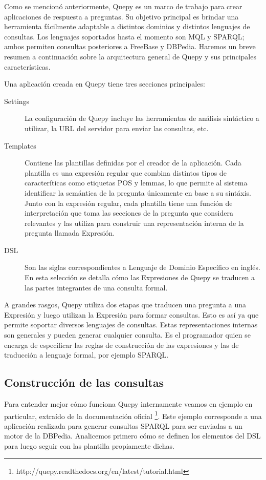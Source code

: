Como se mencionó anteriormente, Quepy es un marco de trabajo para crear aplicaciones de respuesta a preguntas. Su objetivo principal es brindar una herramienta fácilmente adaptable a distintos dominios y distintos lenguajes de consultas. Los lenguajes soportados hasta el momento son MQL y SPARQL; ambos permiten consultas posteriores a FreeBase y DBPedia. Haremos un breve resumen a continuación sobre la arquitectura general de Quepy y sus principales características.

Una aplicación creada en Quepy tiene tres secciones principales:
\begin{description}
    \item[Settings] La configuración de Quepy incluye las herramientas de análisis sintáctico a utilizar, la URL del servidor para enviar las consultas, etc.
    \item[Templates] Contiene las plantillas definidas por el creador de la aplicación. Cada plantilla es una expresión regular que combina distintos tipos de caracteríticas como etiquetas POS y lemmas, lo que permite al sistema identificar la semántica de la pregunta únicamente en base a su sintáxis. Junto con la expresión regular, cada plantilla tiene una función de interpretación que toma las secciones de la pregunta que considera relevantes y las utiliza para construir una representación interna de la pregunta llamada Expresión.
    \item[DSL] Son las siglas correspondientes a Lenguaje de Dominio Específico en inglés. En esta selección se detalla cómo las Expresiones de Quepy se traducen a las partes integrantes de una consulta formal.
\end{description}

A grandes rasgos, Quepy utiliza dos etapas que traducen una pregunta a una Expresión y luego utilizan la Expresión para formar consultas. Esto es así ya que permite soportar diversos lenguajes de consultas. Estas representaciones internas son generales y pueden generar cualquier consulta. Es el programador quien se encarga de especificar las reglas de construcción de las expresiones y las de traducción a lenguaje formal, por ejemplo SPARQL.

\subsection{Construcción de las consultas}

Para entender mejor cómo funciona Quepy internamente veamos en ejemplo en particular, extraído de la documentación oficial \footnote{http://quepy.readthedocs.org/en/latest/tutorial.html}. Este ejemplo corresponde a una aplicación realizada para generar consultas SPARQL para ser enviadas a un motor de la DBPedia. Analicemos primero cómo se definen los elementos del DSL para luego seguir con las plantilla propiamente dichas.

